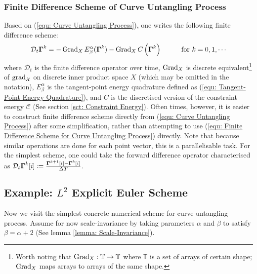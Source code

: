 \documentclass[../dissertation.tex]{subfiles}
\begin{document}
\subsubsection{Finite Difference Scheme of Curve Untangling Process}
Based on (\ref{equ: Curve Untangling Process}), one writes the following finite difference scheme:
\begin{equation}
    \mathcal{D}_{t} \Gammabf^{k} = -\Grad_{X} E_{\beta}^{\alpha} (\Gammabf^k) - \Grad_{X} C \left( \Gammabf^k \right) \hspace{1cm} \text{for } k=0,1,\cdots
    \label{equ: Finite Difference Scheme for Curve Untangling Process}
\end{equation}
where $\mathcal{D}_t$ is the finite difference operator over time,
$\operatorname{Grad}_{X}$ is discrete equivalent\footnote{Worth noting that $\operatorname{Grad}_X:\mathbb{T} \rightarrow \mathbb{T}$ where $\mathbb{T}$ is a set of arrays of certain shape; $\operatorname{Grad}_X$ maps arrays to arrays of the same shape.}  of $\operatorname{grad}_{\mathcal{X}}$ on discrete inner product space $X$ (which may be omitted in the notation),
$E_{\beta}^{\alpha}$ is the tangent-point energy quadrature defined as (\ref{equ: Tangent-Point Energy Quadrature}),
and $C$ is the discretised version of the constraint energy $\mathcal{C}$ (See section \ref{sct: Constraint Energy}).
Often times, however, it is easier to construct finite difference scheme directly from (\ref{equ: Curve Untangling Process}) after some simplification,
rather than attempting to use (\ref{equ: Finite Difference Scheme for Curve Untangling Process}) directly.
Note that because similar operations are done for each point vector, this is a parallelisable task.
For the simplest scheme, one could take the forward difference operator characterised as $\mathcal{D}_t \boldsymbol{\Gamma}^k[i] \coloneqq \frac{\boldsymbol{\Gamma}^{k+1}[i] - \boldsymbol{\Gamma}^{k}[i]}{\Delta T}$.

\subsection{Example: $L^2$ Explicit Euler Scheme}
Now we visit the simplest concrete numerical scheme for curve untangling process.
Assume for now scale-invariance by taking parameters $\alpha$ and $\beta$ to satisfy $\beta = \alpha+2$ (See lemma \ref{lemma: Scale-Invariance}).
\end{document}
